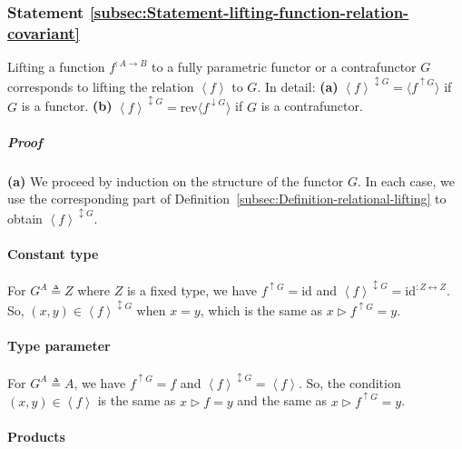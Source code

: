 \subsubsection{Statement \label{subsec:Statement-lifting-function-relation-covariant}\ref{subsec:Statement-lifting-function-relation-covariant}}

Lifting a function $f^{:A\rightarrow B}$ to a fully parametric functor
or a contrafunctor $G$ corresponds to lifting the relation $\left<f\right>$
to $G$. In detail: \textbf{(a)} $\left<f\right>^{\updownarrow G}=\langle f^{\uparrow G}\rangle$
if $G$ is a functor. \textbf{(b)} $\left<f\right>^{\updownarrow G}=\text{rev}\langle f^{\downarrow G}\rangle$
if $G$ is a contrafunctor.

\subparagraph{Proof}

\textbf{(a)} We proceed by induction on the structure of the functor
$G$. In each case, we use the corresponding part of Definition~\ref{subsec:Definition-relational-lifting}
to obtain $\left<f\right>^{\updownarrow G}$.

\paragraph{Constant type}

For $G^{A}\triangleq Z$ where $Z$ is a fixed type, we have $f^{\uparrow G}=\text{id}$
and $\left<f\right>^{\updownarrow G}=\text{id}^{:Z\leftrightarrow Z}$.
So, $(x,y)\in\left<f\right>^{\updownarrow G}$ when $x=y$, which
is the same as $x\triangleright f^{\uparrow G}=y$.

\paragraph{Type parameter}

For $G^{A}\triangleq A$, we have $f^{\uparrow G}=f$ and $\left<f\right>^{\updownarrow G}=\left<f\right>$.
So, the condition $(x,y)\in\left<f\right>$ is the same as $x\triangleright f=y$
and the same as $x\triangleright f^{\uparrow G}=y$.

\paragraph{Products}

